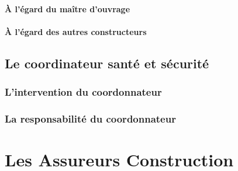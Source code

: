 				\paragraph*{À l'égard du maître d'ouvrage}
				
				\paragraph*{À l'égard des autres constructeurs}
		
		\subsection*{Le coordinateur santé et sécurité}
		
			\subsubsection*{L'intervention du coordonnateur}
			
			\subsubsection*{La responsabilité du coordonnateur}
	
	\section*{Les Assureurs Construction}